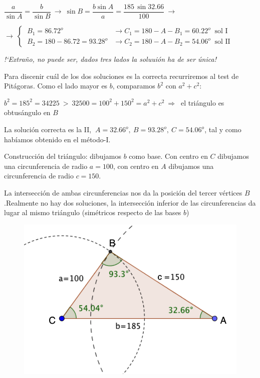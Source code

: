 \begin{miejercicio}
\vspace{2mm} $\dfrac{a}{\sin A}=\dfrac{b}{\sin B} \ \to \ \sin B=\dfrac{b\sin A}{a}=\dfrac{185 \, \sin 32.66}{100} \ \to $

\vspace{2mm}$\to \ \begin{cases}
 	\ B_1=86.72^o &\to C_1=180-A-B_1=60.22^o \ \text{ sol I} \\
 	\ B_2=180-86.72=93.28^o &\to C_2=180-A-B_2=54.06^o \ \text{ sol II} 
 \end{cases}$

\vspace{2mm} \emph{!`Extraño, no puede ser, dados tres lados la soluuión ha de ser única!}

\vspace{2mm} Para discenir cuál de los dos soluciones es la correcta recurriremos al test de Pitágoras. Como el lado mayor es $b$, comparamos $b^2$ con $a^2+c^2$:

\vspace{2mm} $b^2=185^2=34225 \ \boldsymbol{>} \ 32500=100^2+150^2=a^2+c^2 \ \Rightarrow \ $ el triángulo es obtusángulo en $B$

\vspace{2mm} La solución correcta es la II, $\ A=32.66^o,\ B=93.28^o,\ C=54.06^o$, tal y como habíamos obtenido en el método-I.

\begin{multicols}{2}
\begin{footnotesize} Construcción del triángulo:
dibujamos $b$ como base. Con centro en $C$ dibujamos una circunferencia de radio $a=100$, con centro en $A$ dibujamos una circunferencia de radio $c=150$.

La intersección de ambas circunferencias nos da la posición del tercer vértices $B$.\textcolor{gris}{Realmente no hay dos soluciones, la intersección inferior de las circunferencias da lugar al mismo triángulo (simétricos respecto de las bases $b$)}\end{footnotesize}
\begin{figure}[H]
	\centering
	\includegraphics[width=.4\textwidth]{img-triang/triang11.png}
\end{figure}	
\end{multicols}	
\end{miejercicio}

